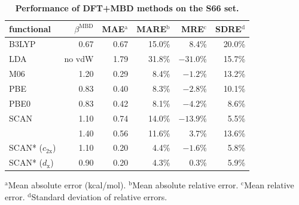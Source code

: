 \begin{table}
\caption{\textbf{Performance of DFT+MBD methods on the S66 set.}}\label{tab:statistics}
\begin{tabular}{lrrrrr}
\toprule
functional  & $\beta^\text{MBD}$ & MAE$^\text{a}$  & MARE$^\text{b}$   & MRE$^\text{c}$     & SDRE$^\text{d}$ \\
\midrule
B3LYP                   & 0.67   & 0.67 & 15.0\% & 8.4\%   & 20.0\% \\
LDA                     & no vdW & 1.79 & 31.8\% & $-31.0\%$ & 15.7\% \\
M06                     & 1.20   & 0.29 & 8.4\%  & $-1.2\%$  & 13.2\% \\
PBE                     & 0.83   & 0.40 & 8.3\%  & $-2.8\%$  & 10.1\% \\
PBE0                    & 0.83   & 0.42 & 8.1\%  & $-4.2\%$  & 8.6\%  \\
SCAN                    & 1.10   & 0.74 & 14.0\% & $-13.9\%$ & 5.5\%  \\
                        & 1.40   & 0.56 & 11.6\% & 3.7\%   & 13.6\% \\
SCAN* ($c_\mathrm{2x}$) & 1.10   & 0.20 & 4.4\%  & $-1.6\%$  & 5.8\%  \\ %
SCAN* ($d_\mathrm{x}$)  & 0.90   & 0.20 & 4.3\%  & 0.3\%   & 5.9\%  \\ %
\bottomrule
\end{tabular}
\small
$^\text{a}$Mean absolute error (kcal/mol). $^\text{b}$Mean absolute relative error. $^\text{c}$Mean relative error. $^\text{d}$Standard deviation of relative errors.
\end{table}

